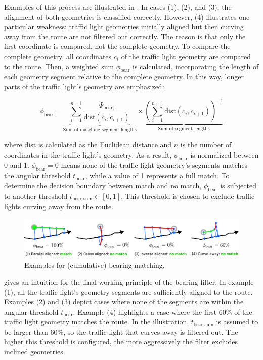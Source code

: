 Examples of this process are illustrated in . In cases (1), (2), and (3), the alignment of both geometries is classified correctly. However, (4) illustrates one particular weakness: traffic light geometries initially aligned but then curving away from the route are not filtered out correctly. The reason is that only the first coordinate is compared, not the complete geometry. To compare the complete geometry, all coordinates $c_i$ of the traffic light geometry are compared to the route. Then, a weighted sum $\phi_{\text{bear}}$ is calculated, incorporating the length of each geometry segment relative to the complete geometry. In this way, longer parts of the traffic light's geometry are emphasized:

\begin{equation} 
\phi_{\text{bear}} = 
    \underbrace{\sum_{i=1}^{n-1} 
    \frac{\Psi_{\text{bear}_i}}{\text{dist}(c_i, c_{i+1})}}_{\text{Sum of matching segment lengths}}
    \times
    \underbrace{(\sum_{i=1}^{n-1} \text{dist}(c_i, c_{i+1}))^{-1}}_{\text{Sum of segment lengths}}
\end{equation}

where $\text{dist}$ is calculated as the Euclidean distance and $n$ is the number of coordinates in the traffic light's geometry. As a result, $\phi_{\text{bear}}$ is normalized between 0 and 1. $\phi_{\text{bear}} = 0$ means none of the traffic light geometry's segments matches the angular threshold $t_{\text{bear}}$, while a value of 1 represents a full match. To determine the decision boundary between match and no match, $\phi_{\text{bear}}$ is subjected to another threshold $t_{\text{bear\_sum}} \in [0, 1]$. This threshold is chosen to exclude traffic lights curving away from the route.

\begin{figure}[b]
\centering
\includegraphics[width=\linewidth]{images/sg-selection-bearing-filter-sum.pdf}
\caption{Examples for (cumulative) bearing matching.}
\label{fig:sg-selection-bearing-filter-sum}
\end{figure}

 gives an intuition for the final working principle of the bearing filter. In example (1), all the traffic light's geometry segments are sufficiently aligned to the route. Examples (2) and (3) depict cases where none of the segments are within the angular threshold $t_{\text{bear}}$. Example (4) highlights a case where the first 60\% of the traffic light geometry matches the route. In the illustration, $t_{\text{bear\_sum}}$ is assumed to be larger than 60\%, so the traffic light that curves away is filtered out. The higher this threshold is configured, the more aggressively the filter excludes inclined geometries.

